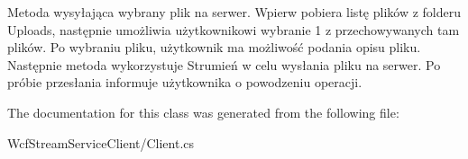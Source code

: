 Metoda wysyłająca wybrany plik na serwer. Wpierw pobiera listę plików z folderu \textquotesingle{}Uploads\textquotesingle{}, następnie umożliwia użytkownikowi wybranie 1 z przechowywanych tam plików. Po wybraniu pliku, użytkownik ma możliwość podania opisu pliku. Następnie metoda wykorzystuje Strumień w celu wysłania pliku na serwer. Po próbie przesłania informuje użytkownika o powodzeniu operacji. 



The documentation for this class was generated from the following file\+:\begin{DoxyCompactItemize}
\item 
Wcf\+Stream\+Service\+Client/Client.\+cs\end{DoxyCompactItemize}
